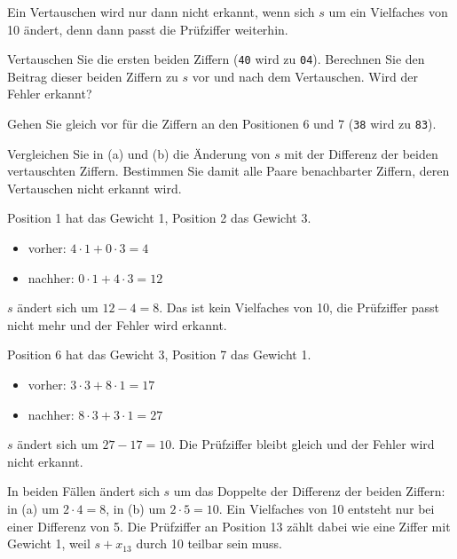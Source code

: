 \begin{myexercise}
    Ein Vertauschen wird nur dann nicht erkannt, wenn sich $s$ um ein Vielfaches von 10 ändert, denn dann passt die Prüfziffer weiterhin.
    \begin{aenum}
        \item Vertauschen Sie die ersten beiden Ziffern (\texttt{40} wird zu \texttt{04}). Berechnen Sie den Beitrag dieser beiden Ziffern zu $s$ vor und nach dem Vertauschen. Wird der Fehler erkannt?
        \item Gehen Sie gleich vor für die Ziffern an den Positionen 6 und 7 (\texttt{38} wird zu \texttt{83}).
        \item Vergleichen Sie in (a) und (b) die Änderung von $s$ mit der Differenz der beiden vertauschten Ziffern. Bestimmen Sie damit alle Paare benachbarter Ziffern, deren Vertauschen nicht erkannt wird.
    \end{aenum}
    \begin{myanswer}
        \begin{aenum}
            \item Position 1 hat das Gewicht 1, Position 2 das Gewicht 3.
                  \begin{itemize}
                      \item vorher: $4 \cdot 1 + 0 \cdot 3 = 4$
                      \item nachher: $0 \cdot 1 + 4 \cdot 3 = 12$
                  \end{itemize}
                  $s$ ändert sich um $12 - 4 = 8$. Das ist kein Vielfaches von 10, die Prüfziffer passt nicht mehr und der Fehler wird erkannt.
            \item Position 6 hat das Gewicht 3, Position 7 das Gewicht 1.
                  \begin{itemize}
                      \item vorher: $3 \cdot 3 + 8 \cdot 1 = 17$
                      \item nachher: $8 \cdot 3 + 3 \cdot 1 = 27$
                  \end{itemize}
                  $s$ ändert sich um $27 - 17 = 10$. Die Prüfziffer bleibt gleich und der Fehler wird nicht erkannt.
            \item In beiden Fällen ändert sich $s$ um das Doppelte der Differenz der beiden Ziffern: in (a) um $2 \cdot 4 = 8$, in (b) um $2 \cdot 5 = 10$. Ein Vielfaches von 10 entsteht nur bei einer Differenz von 5. Die Prüfziffer an Position 13 zählt dabei wie eine Ziffer mit Gewicht 1, weil $s + x_{13}$ durch 10 teilbar sein muss.


\end{aenum}
\end{myanswer}
\end{myexercise}
